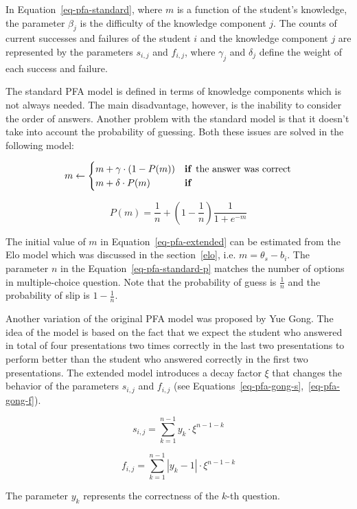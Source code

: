 In Equation~\ref{eq-pfa-standard}, where $m$ is a function of the student's knowledge, the parameter $\beta_j$ is the difficulty of the knowledge component $j$. The counts of current successes and failures of the student $i$ and the knowledge component $j$ are represented by the parameters $s_{i,j}$ and $f_{i,j}$, where $\gamma_j$ and $\delta_j$ define the weight of each success and failure.

The standard PFA model is defined in terms of knowledge components which is not always needed. The main disadvantage, however, is the inability to consider the order of answers. Another problem with the standard model is that it doesn't take into account the probability of guessing. Both these issues are solved in the following model:

\begin{equation} \label{eq-pfa-extended}
  m \gets \begin{cases}
            m + \gamma \cdot (1 - P(m)) & \text{\textbf{if }} \text{the answer was correct} \\
            m + \delta \cdot P(m) & \text{\textbf{if}}
          \end{cases}
\end{equation}

\begin{equation} \label{eq-pfa-standard-p}
  P(m) = \frac{1}{n} + \left(1 - \frac{1}{n}\right)\frac{1}{1 + e^{-m}}
\end{equation}

The initial value of $m$ in Equation~\ref{eq-pfa-extended} can be estimated from the Elo model which was discussed in the section~\ref{elo}, i.e. $m = \theta_s - b_i$. The parameter $n$ in the Equation~\ref{eq-pfa-standard-p} matches the number of options in multiple-choice question. Note that the probability of guess is $\frac{1}{n}$ and the probability of slip is $1 - \frac{1}{n}$.

Another variation of the original PFA model was proposed by Yue Gong. The idea of the model is based on the fact that we expect the student who answered in total of four presentations two times correctly in the last two presentations to perform better than the student who answered correctly in the first two presentations. The extended model introduces a decay factor $\xi$ that changes the behavior of the parameters $s_{i,j}$ and $f_{i,j}$ (see Equations~\ref{eq-pfa-gong-s},~\ref{eq-pfa-gong-f}).


\begin{equation} \label{eq-pfa-gong-s}
  s_{i,j} = \sum_{k=1}^{n-1} y_k \cdot \xi^{n-1-k}
\end{equation}

\begin{equation} \label{eq-pfa-gong-f}
  f_{i,j} = \sum_{k=1}^{n-1} |y_k - 1| \cdot \xi^{n-1-k}
\end{equation}

The parameter $y_k$ represents the correctness of the $k$-th question.
